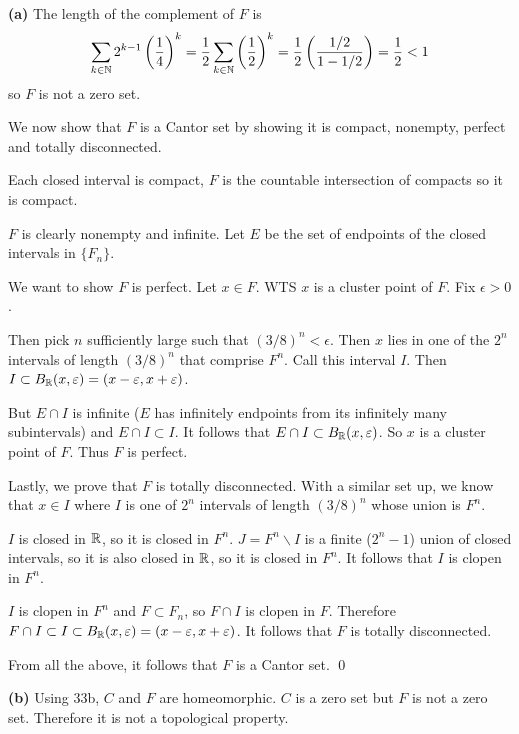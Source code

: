\documentclass[a4paper, 12pt]{article}
\begin{document}
\begin{solution}
    \textbf{(a)} The length of the complement of $F$ is \[
        \sum_{k\in \mathbb{N}} 2^{k-1} \left(\frac{1}{4}\right)^k = \frac{1}{2} \sum_{k \in \mathbb{N}} \left(\frac{1}{2}\right)^k = \frac{1}{2} \left(\frac{1/2}{1 - 1/2}\right) = \frac{1}{2} < 1
    \]
    so $F$ is not a zero set.

    We now show that $F$ is a Cantor set by showing it is compact, nonempty, perfect and totally disconnected.

    Each closed interval is compact, $F$ is the countable intersection of compacts so it is compact.

    $F$ is clearly nonempty and infinite. Let $E$ be the set of endpoints of the closed intervals in $\{F_n\}$.

    We want to show $F$ is perfect. Let $x \in F$. WTS $x$ is a cluster point of $F$. Fix $\epsilon > 0$.

    Then pick $n$ sufficiently large such that $(3/8)^n < \epsilon$. Then $x$ lies in one of the $2^n$ intervals of length $(3/8)^n$ that comprise $F^n$. Call this interval $I$. Then $I \subset B_{\mathbb{R}}(x, \varepsilon) = (x- \varepsilon, x + \varepsilon)$.

    But $E \cap I$ is infinite ($E$ has infinitely endpoints from its infinitely many subintervals) and $E \cap I \subset I$. It follows that $E \cap I \subset B_{\mathbb{R}}(x, \varepsilon)$. So $x$ is a cluster point of $F$. Thus $F$ is perfect.

    Lastly, we prove that $F$ is totally disconnected. With a similar set up, we know that $x \in I$ where $I$ is one of $2^n$ intervals of length $(3/8)^n$ whose union is $F^n$.

    $I$ is closed in $\mathbb{R}$, so it is closed in $F^n$. $J = F^n \backslash I$ is a finite ($2^n -1$) union of closed intervals, so it is also closed in $\mathbb{R}$, so it is closed in $F^n$. It follows that $I$ is clopen in $F^n$.

    $I$ is clopen in $F^n$ and $F \subset F_n$, so $F \cap I$ is clopen in $F$. Therefore $F \cap I \subset I \subset B_{\mathbb{R}}(x, \varepsilon) = (x-\varepsilon, x + \varepsilon)$. It follows that $F$ is totally disconnected.

    From all the above, it follows that $F$ is a Cantor set. \qed

    \textbf{(b)} Using 33b, $C$ and $F$ are homeomorphic. $C$ is a zero set but $F$ is not a zero set. Therefore it is not a topological property.
\end{solution}
\end{document}
